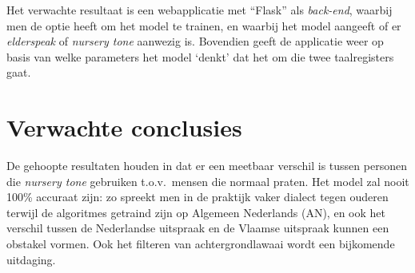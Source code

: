 Het verwachte resultaat is een webapplicatie met ``Flask'' als \textit{back-end}, waarbij men de optie heeft om het model te trainen, en waarbij het model aangeeft of er \textit{elderspeak} of \textit{nursery tone} aanwezig is. Bovendien geeft de applicatie weer op basis van welke parameters het model `denkt' dat het om die twee taalregisters gaat.

\section{Verwachte conclusies}
\label{sec:verwachte_conclusies}

De gehoopte resultaten houden in dat er een meetbaar verschil is tussen personen die \textit{nursery tone} gebruiken t.o.v.\ mensen die normaal praten.
Het model zal nooit 100\% accuraat zijn: zo spreekt men in de praktijk vaker dialect tegen ouderen terwijl de algoritmes getraind zijn op Algemeen Nederlands (AN), en ook het verschil tussen de Nederlandse uitspraak en de Vlaamse uitspraak kunnen een obstakel vormen.
Ook het filteren van achtergrondlawaai wordt een bijkomende uitdaging.

